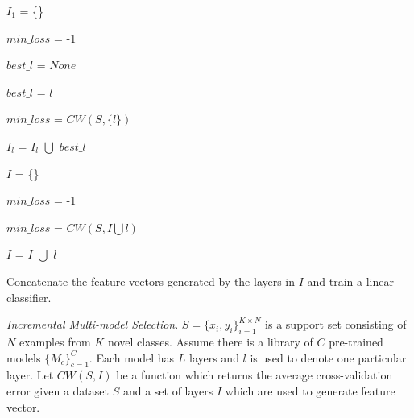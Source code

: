 \documentclass[runningheads]{llncs}
\begin{document}
\begin{algorithm}[h]
\DontPrintSemicolon

  $I_1$ = \{\}
  
    
    { 
        $min\_loss$ = -1
        
        $best\_l$ = $None$
        
        
        {
            {  
                $best\_l$ = $l$
                
                $min\_loss$ = $CW(S, \{l\})$
            }
        }
        $I_l$ = $I_l$ $\bigcup$ $best\_l$
    }
    $I$ = \{\}
    
    $min\_loss$ = -1
    
        {
            {  
                $min\_loss$ = $CW(S, I \bigcup l)$
                 
                $I$ = $I$ $\bigcup$ $l$
            }
        }
        
    Concatenate the feature vectors generated by the layers in $I$ and train a linear classifier.

\caption{\emph{Incremental Multi-model Selection}. $S = \{x_i, y_i\}_{i=1}^{K \times N}$ is a support set consisting of $N$ examples from $K$ novel classes. Assume there is a library of $C$ pre-trained models $\{M_c\}^C_{c=1}$. Each model has $L$ layers and $l$ is used to denote one particular layer. Let $CW(S, I)$ be a function which returns the average cross-validation error given a dataset $S$ and a set of layers $I$ which are used to generate feature vector.} 
\label{alg: ims}
\end{algorithm}
\end{document}
